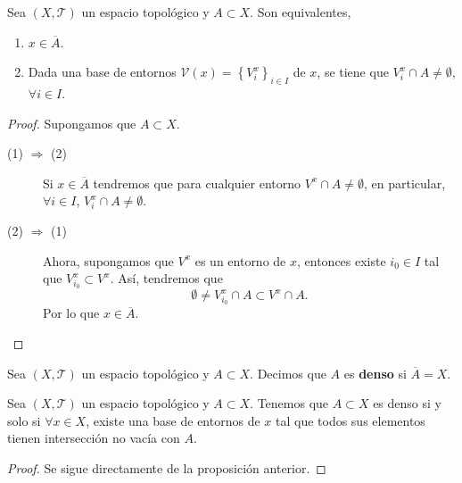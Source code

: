 \begin{prop}
Sea $\displaystyle \left(X, \mathcal{T}\right) $ un espacio topológico y $\displaystyle A \subset X $. Son equivalentes,
\begin{enumerate}
\item $\displaystyle x \in \overline{A} $. 
\item Dada una base de entornos $\displaystyle \mathcal{V}\left(x\right)= \left\{ V_{i}^{x}\right\} _{i \in I} $ de $\displaystyle x $, se tiene que $\displaystyle V_{i}^{x}\cap A \neq \emptyset $, $\displaystyle \forall i \in I $.
\end{enumerate}
\end{prop}
\begin{proof} Supongamos que $\displaystyle A \subset X $.
\begin{description}
\item[(1) $\displaystyle \Rightarrow $ (2)] Si $\displaystyle x \in \overline{A} $ tendremos que para cualquier entorno $\displaystyle V^{x} \cap A \neq \emptyset $, en particular, $\displaystyle \forall i \in I $, $\displaystyle V^{x}_{i} \cap A \neq \emptyset $. 
\item[(2) $\displaystyle \Rightarrow $ (1)] Ahora, supongamos que $\displaystyle V^{x} $ es un entorno de $\displaystyle x $, entonces existe $\displaystyle i_{0} \in I $ tal que $\displaystyle V^{x}_{i_{0}}\subset V^{x} $. Así, tendremos que 
	\[\emptyset \neq V_{i_{0}}^{x} \cap A \subset V^{x} \cap A .\]
	Por lo que $\displaystyle x \in \overline{A} $.
\end{description}
\end{proof}

\begin{definition}
Sea $\displaystyle \left(X, \mathcal{T}\right) $ un espacio topológico y $\displaystyle A \subset X $. Decimos que $\displaystyle A $ es \textbf{denso} si $\displaystyle \overline{A}=X $.
\end{definition}
\begin{prop}
Sea $\displaystyle \left(X, \mathcal{T}\right) $ un espacio topológico y $\displaystyle A \subset X $. Tenemos que $\displaystyle A \subset X $ es denso si y solo si $\displaystyle \forall x \in X $, existe una base de entornos de $\displaystyle x $ tal que todos sus elementos tienen intersección no vacía con $\displaystyle A $. 
\end{prop}
\begin{proof}
Se sigue directamente de la proposición anterior.
\end{proof}
